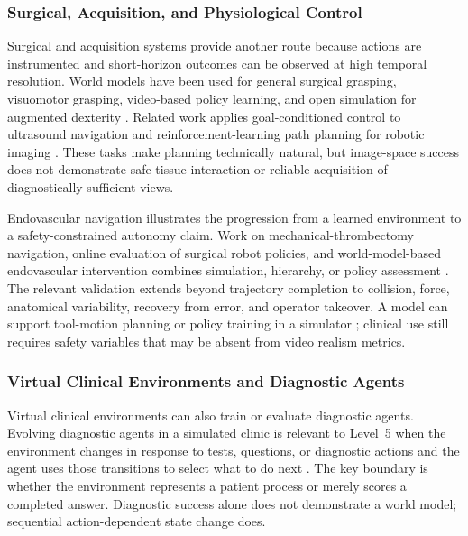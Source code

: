 \subsubsection{Surgical, Acquisition, and Physiological Control}

Surgical and acquisition systems provide another route because actions are instrumented and short-horizon outcomes can be observed at high temporal resolution. World models have been used for general surgical grasping, visuomotor grasping, video-based policy learning, and open simulation for augmented dexterity \citep{Lin2024WorldModelsGeneral,unknown2025VisuomotorGraspingWorld,unknown2025SurgWorldCosmosH,Yu2024OrbitSurgicalOpen}. Related work applies goal-conditioned control to ultrasound navigation and reinforcement-learning path planning for robotic imaging \citep{Amadou2024GoalConditionedReinforcement,Bi2026AutonomousPathPlanning}. These tasks make planning technically natural, but image-space success does not demonstrate safe tissue interaction or reliable acquisition of diagnostically sufficient views.

Endovascular navigation illustrates the progression from a learned environment to a safety-constrained autonomy claim. Work on mechanical-thrombectomy navigation, online evaluation of surgical robot policies, and world-model-based endovascular intervention combines simulation, hierarchy, or policy assessment \citep{Robertshaw2025WorldModelAi,Zbinden2026CosmosSurgDVRK,Robertshaw2026SafeAutonomousRobotic,Robertshaw2026AiAutonomousNavigation}. The relevant validation extends beyond trajectory completion to collision, force, anatomical variability, recovery from error, and operator takeover. A model can support tool-motion planning or policy training in a simulator \citep{Yue2025EchoWorldLearningMotion,Rapuri2026SAWTowardSurgical}; clinical use still requires safety variables that may be absent from video realism metrics.

\subsubsection{Virtual Clinical Environments and Diagnostic Agents}

Virtual clinical environments can also train or evaluate diagnostic agents. Evolving diagnostic agents in a simulated clinic is relevant to Level~5 when the environment changes in response to tests, questions, or diagnostic actions and the agent uses those transitions to select what to do next \citep{unknown2025EvolvingDiagnosticAgents}. The key boundary is whether the environment represents a patient process or merely scores a completed answer. Diagnostic success alone does not demonstrate a world model; sequential action-dependent state change does.

